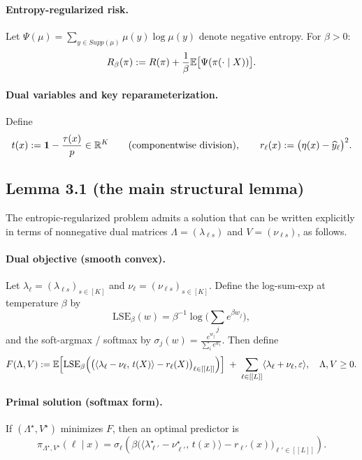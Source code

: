 \documentclass[11pt]{article}
\begin{document}
\paragraph{Entropy-regularized risk.}
Let $\Psi(\mu)=\sum_{y\in Supp(\mu)}\mu(y)\log\mu(y)$ denote negative entropy. For $\beta>0$:
\begin{equation}
R_\beta(\pi):=R(\pi) + \frac{1}{\beta}\mathbb{E}\big[\Psi(\pi(\cdot\mid X))\big].
\end{equation}

\paragraph{Dual variables and key reparameterization.}
Define
\begin{equation}
t(x):= \mathbf{1} - \frac{\tau(x)}{p}\in\mathbb{R}^K \qquad (\text{componentwise division}),
\qquad
r_\ell(x):=\big(\eta(x)-\widehat y_\ell\big)^2.
\end{equation}

\subsection{Lemma 3.1 (the main structural lemma)}
The entropic-regularized problem admits a solution that can be written explicitly in terms of
nonnegative dual matrices $\Lambda=(\lambda_{\ell s})$ and $V=(\nu_{\ell s})$, as follows. 

\paragraph{Dual objective (smooth convex).}
Let $\lambda_\ell=(\lambda_{\ell s})_{s\in[K]}$ and $\nu_\ell=(\nu_{\ell s})_{s\in[K]}$.
Define the log-sum-exp at temperature $\beta$ by
\begin{equation}
\mathrm{LSE}_\beta(w)=\beta^{-1}\log\Big(\sum_j e^{\beta w_j}\Big),
\end{equation}
and the soft-argmax / softmax by $\sigma_j(w)=\frac{e^{w_j}}{\sum_i e^{w_i}}$.
Then define
\begin{equation}
F(\Lambda,V):=
\mathbb{E}\Big[
\mathrm{LSE}_\beta\Big( \big(\langle \lambda_\ell-\nu_\ell,\,t(X)\rangle - r_\ell(X)\big)_{\ell\in[[L]]}\Big)
\Big]
\;+\;
\sum_{\ell\in[[L]]}\langle \lambda_\ell+\nu_\ell,\varepsilon\rangle,
\quad \Lambda,V\ge 0.
\end{equation}

\paragraph{Primal solution (softmax form).}
If $(\Lambda^\star,V^\star)$ minimizes $F$, then an optimal predictor is
\begin{equation}
\boxed{
\pi_{\Lambda^\star,V^\star}(\ell\mid x)
=
\sigma_\ell\!\left(
\beta\big(\langle \lambda^\star_{\ell'}-\nu^\star_{\ell'},\,t(x)\rangle - r_{\ell'}(x)\big)_{\ell'\in[[L]]}
\right).
}
\end{equation}
\end{document}
